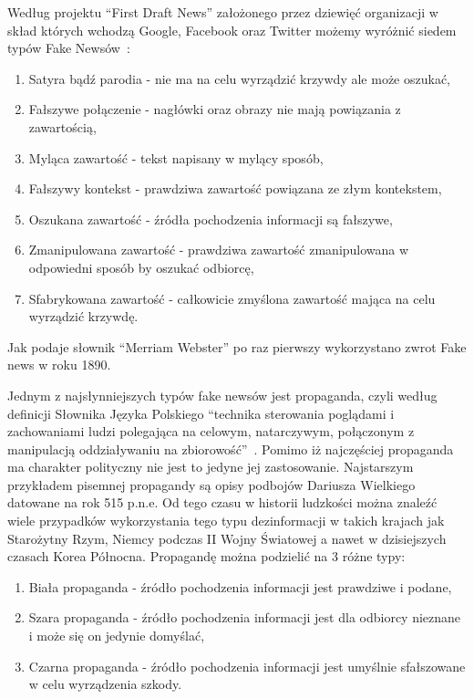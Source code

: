 Według projektu ``First Draft News'' założonego przez dziewięć organizacji 
w skład których wchodzą Google, Facebook oraz Twitter 
możemy wyróżnić siedem typów Fake Newsów~\cite{TypesOfFakeNews}:
\begin{enumerate}
    \item Satyra bądź parodia - nie ma na celu wyrządzić krzywdy ale może oszukać,
    \item Fałszywe połączenie - nagłówki oraz obrazy nie mają powiązania z zawartością,
    \item Myląca zawartość - tekst napisany w mylący sposób,
    \item Fałszywy kontekst - prawdziwa zawartość powiązana ze złym kontekstem,
    \item Oszukana zawartość - źródła pochodzenia informacji są fałszywe,
    \item Zmanipulowana zawartość - prawdziwa zawartość zmanipulowana w odpowiedni sposób by oszukać odbiorcę,
    \item Sfabrykowana zawartość - całkowicie zmyślona zawartość mająca na celu wyrządzić krzywdę.
\end{enumerate}
Jak podaje słownik ``Merriam Webster'' po raz pierwszy wykorzystano zwrot
Fake news w roku 1890.


Jednym z najsłynniejszych typów fake newsów jest propaganda, czyli według 
definicji Słownika Języka Polskiego ``technika sterowania poglądami i zachowaniami ludzi polegająca na 
celowym, natarczywym, połączonym z manipulacją oddziaływaniu na zbiorowość''~\cite{SJP}.
Pomimo iż najczęściej propaganda ma charakter polityczny nie jest to jedyne 
jej zastosowanie. Najstarszym przykładem pisemnej propagandy są opisy podbojów
Dariusza Wielkiego datowane na rok 515 p.n.e. Od tego czasu w historii ludzkości
można znaleźć wiele przypadków wykorzystania tego typu dezinformacji w takich krajach
jak Starożytny Rzym, Niemcy podczas II Wojny Światowej a nawet w dzisiejszych 
czasach Korea Północna.
Propagandę można podzielić na 3 różne typy:
\begin{enumerate}
    \item Biała propaganda - źródło pochodzenia informacji jest prawdziwe i podane,
    \item Szara propaganda - źródło pochodzenia informacji jest dla odbiorcy nieznane i może się on jedynie domyślać,
    \item Czarna propaganda - źródło pochodzenia informacji jest umyślnie sfałszowane w celu wyrządzenia szkody.
\end{enumerate}


